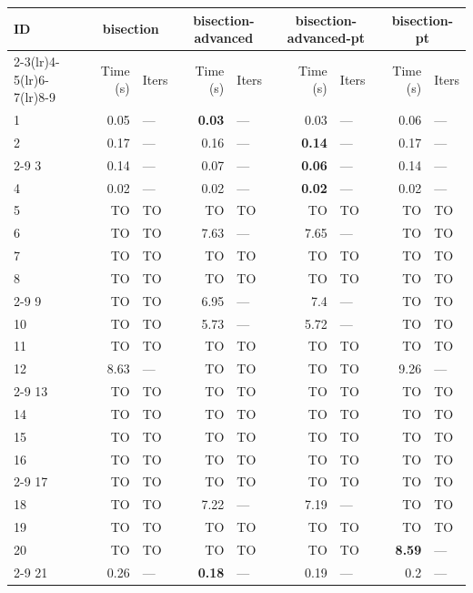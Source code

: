 \begin{longtable}{lr@{\hskip 4pt}l@{\hskip 12pt}r@{\hskip 4pt}l@{\hskip 12pt}r@{\hskip 4pt}l@{\hskip 12pt}r@{\hskip 4pt}l@{\hskip 12pt}}
\toprule
ID & \multicolumn{2}{c}{bisection} & \multicolumn{2}{c}{bisection-advanced} & \multicolumn{2}{c}{bisection-advanced-pt} & \multicolumn{2}{c}{bisection-pt} \\
\cmidrule(lr){2-3}\cmidrule(lr){4-5}\cmidrule(lr){6-7}\cmidrule(lr){8-9}
 & Time (s) &  Iters & Time (s) &  Iters & Time (s) &  Iters & Time (s) &  Iters \\
\midrule
\endhead
1 & 0.05 & --- & \textbf{0.03} & --- & 0.03 & --- & 0.06 & --- \\
2 & 0.17 & --- & 0.16 & --- & \textbf{0.14} & --- & 0.17 & --- \\
\cmidrule{2-9}
3 & 0.14 & --- & 0.07 & --- & \textbf{0.06} & --- & 0.14 & --- \\
4 & 0.02 & --- & 0.02 & --- & \textbf{0.02} & --- & 0.02 & --- \\
\midrule
5 & TO & TO & TO & TO & TO & TO & TO & TO \\
6 & TO & TO & 7.63 & --- & 7.65 & --- & TO & TO \\
7 & TO & TO & TO & TO & TO & TO & TO & TO \\
8 & TO & TO & TO & TO & TO & TO & TO & TO \\
\cmidrule{2-9}
9 & TO & TO & 6.95 & --- & 7.4 & --- & TO & TO \\
10 & TO & TO & 5.73 & --- & 5.72 & --- & TO & TO \\
11 & TO & TO & TO & TO & TO & TO & TO & TO \\
12 & 8.63 & --- & TO & TO & TO & TO & 9.26 & --- \\
\cmidrule{2-9}
13 & TO & TO & TO & TO & TO & TO & TO & TO \\
14 & TO & TO & TO & TO & TO & TO & TO & TO \\
15 & TO & TO & TO & TO & TO & TO & TO & TO \\
16 & TO & TO & TO & TO & TO & TO & TO & TO \\
\cmidrule{2-9}
17 & TO & TO & TO & TO & TO & TO & TO & TO \\
18 & TO & TO & 7.22 & --- & 7.19 & --- & TO & TO \\
19 & TO & TO & TO & TO & TO & TO & TO & TO \\
20 & TO & TO & TO & TO & TO & TO & \textbf{8.59} & --- \\
\cmidrule{2-9}
21 & 0.26 & --- & \textbf{0.18} & --- & 0.19 & --- & 0.2 & --- \\

\end{longtable}
